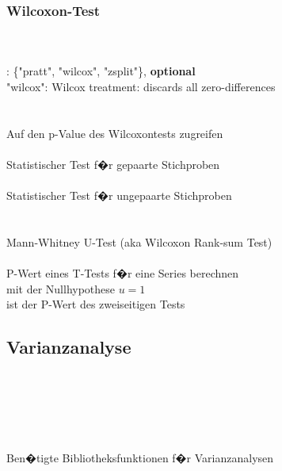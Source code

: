 \documentclass{article}
\begin{document}
\begin{multicols*}{3}
\subsubsection*{Wilcoxon-Test}
\\
\vspace{0.5em}\\
 : \{"pratt", "wilcox", "zsplit"\}, \textbf{optional}\\
"wilcox": Wilcox treatment: discards all zero-differences
\vspace{0.5em}\\
\\
 \\
Auf den p-Value des Wilcoxontests zugreifen\\

 \\
Statistischer Test f�r gepaarte Stichproben  \\

 \\
Statistischer Test f�r ungepaarte Stichproben  \\

\\
 \\
Mann-Whitney U-Test (aka Wilcoxon Rank-sum Test) \\

 \\
P-Wert eines T-Tests f�r eine Series berechnen \\
mit der Nullhypothese $u=1$ \\
\colorbox{red!20!white}{ ist der P-Wert des zweiseitigen Tests}\\

\subsection*{Varianzanalyse}
 \\
 \\
 \\
 \\
 \\
Ben�tigte Bibliotheksfunktionen f�r Varianzanalysen


\end{multicols*}
\end{document}
